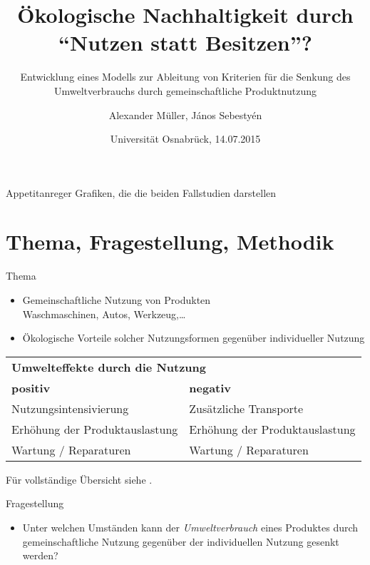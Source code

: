 \documentclass[beamer, xcolor={table,usenames,dvipsnames}]{beamer}
\title{Ökologische Nachhaltigkeit durch \\ \enquote{Nutzen statt Besitzen}?}
\subtitle{{\small Entwicklung eines Modells zur Ableitung von Kriterien für die Senkung des Umweltverbrauchs durch gemeinschaftliche Produktnutzung}}
\author{Alexander Müller, János Sebestyén}
\date{Universität Osnabrück, 14.07.2015}
\begin{document}
\frame{\titlepage}


\begin{frame}{Appetitanreger}
    Grafiken, die die beiden Fallstudien darstellen
\end{frame}
\section{Thema, Fragestellung, Methodik}

	\begin{frame}{Thema}
        \begin{itemize}
            \item Gemeinschaftliche Nutzung von Produkten \\ Waschmaschinen,
                Autos, Werkzeug,\dots
            \item Ökologische Vorteile solcher Nutzungsformen gegenüber
                individueller Nutzung
        \end{itemize}
        	\begin{center}
        		\small
        		\begin{tabular}{p{5cm}p{5cm}}
        			\multicolumn{2}{l}{\textbf{Umwelteffekte durch die
        					Nutzung}}  \\[5pt]
        			\textbf{positiv} & \textbf{negativ} \\
        			\midrule
        			Nutzungsintensivierung  &  Zusätzliche Transporte
        			\\[3pt]
        			Erhöhung der Produktauslastung  & Erhöhung der Produktauslastung \\[3pt]
        			Wartung / Reparaturen &  Wartung / Reparaturen \\[3pt]
        			\bottomrule
        		\end{tabular}
        		\vspace{3pt}
        		
        		Für vollständige Übersicht siehe \cite{scholl_marketing_2009}.
        \end{center}
	\end{frame}


	
	\begin{frame}{Fragestellung}
      \begin{block}{}
	        	\begin{itemize}
	        		\item[] Unter welchen Umständen kann der \textit{Umweltverbrauch} eines Produktes durch gemeinschaftliche Nutzung gegenüber der individuellen Nutzung gesenkt werden?
	        	\end{itemize}
      \end{block}
	\end{frame}
	
\end{document}
